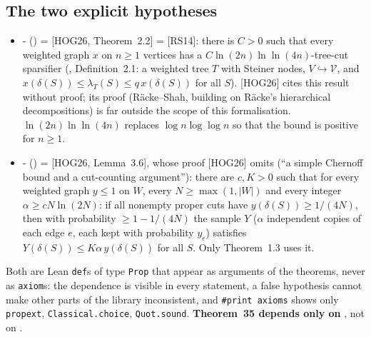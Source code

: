 \subsection{The two explicit hypotheses}
\begin{itemize}
\item \hyp{} () = [HOG26, Theorem~2.2] = [RS14]: there is
  $C>0$ such that every weighted graph $x$ on $n\ge1$ vertices has a $C\ln(2n)\ln\ln(4n)$-tree-cut sparsifier
  (, Definition~2.1: a weighted tree $T$ with Steiner nodes, $V\hookrightarrow\mathcal V$,
  and $x(\delta(S))\le\lambda_T(S)\le q\,x(\delta(S))$ for all $S$). [HOG26] cites this result without proof;
  its proof (R\"acke--Shah, building on R\"acke's hierarchical decompositions) is far outside the scope of
  this formalisation. $\ln(2n)\ln\ln(4n)$ replaces $\log n\log\log n$ so that the bound is positive for $n\ge1$.
\item \hyp{} () = [HOG26, Lemma~3.6], whose proof [HOG26]
  omits (``a simple Chernoff bound and a cut-counting argument''): there are $c,K>0$ such that for every
  weighted graph $y\le1$ on $W$, every $N\ge\max(1,|W|)$ and every integer $\alpha\ge cN\ln(2N)$: if all
  nonempty proper cuts have $y(\delta(S))\ge1/(4N)$, then with probability $\ge1-1/(4N)$ the sample $Y$
  ($\alpha$ independent copies of each edge $e$, each kept with probability $y_e$) satisfies
  $Y(\delta(S))\le K\alpha\,y(\delta(S))$ for all $S$. Only Theorem~1.3 uses it.
\end{itemize}
Both are Lean \texttt{def}s of type \texttt{Prop} that appear as arguments of the theorems, never as
\texttt{axiom}s: the dependence is visible in every statement, a false hypothesis cannot make other parts
of the library inconsistent, and \texttt{\#print axioms} shows only \texttt{propext}, \texttt{Classical.choice},
\texttt{Quot.sound}. \textbf{Theorem~35 depends only on }, not on .

